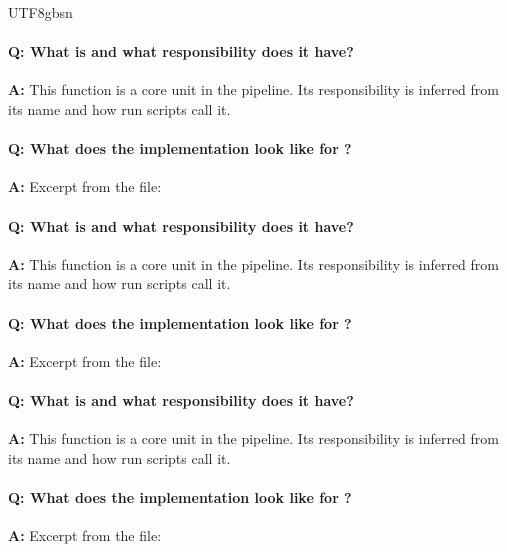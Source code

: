 \documentclass[11pt]{article}
\begin{document}
\begin{CJK*}{UTF8}{gbsn}
\paragraph{Q: What is \texttt{} and what responsibility does it have?}
\textbf{A:} This function is a core unit in the pipeline. Its responsibility is inferred from its name and how run scripts call it.

\paragraph{Q: What does the implementation look like for \texttt{}?}
\textbf{A:} Excerpt from the file:

\vspace{1mm}


\paragraph{Q: What is \texttt{} and what responsibility does it have?}
\textbf{A:} This function is a core unit in the pipeline. Its responsibility is inferred from its name and how run scripts call it.

\paragraph{Q: What does the implementation look like for \texttt{}?}
\textbf{A:} Excerpt from the file:

\vspace{1mm}


\paragraph{Q: What is \texttt{} and what responsibility does it have?}
\textbf{A:} This function is a core unit in the pipeline. Its responsibility is inferred from its name and how run scripts call it.

\paragraph{Q: What does the implementation look like for \texttt{}?}
\textbf{A:} Excerpt from the file:


\end{CJK*}
\end{document}
